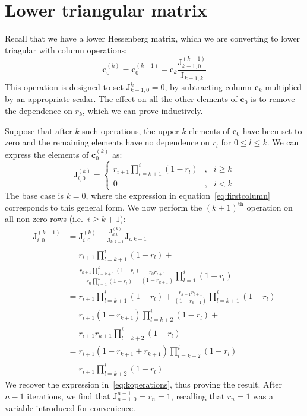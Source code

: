 \documentclass[aps,prl,twocolumn,floatfix]{revtex4}
\renewcommand{\vec}[1]{\mathbf{#1}}
\newcommand{\mat}[1]{\mathrm{#1}}
\begin{document}
\appendix
\section{Lower triangular matrix}
\label{app:triangular}
Recall that we have a lower Hessenberg matrix, which we are converting to lower
triagular with column operations:
\begin{equation}
  \vec{c}_{0}^{\left(k\right)} = \vec{c}_{0}^{\left(k-1\right)} - \vec{c}_{k}
  \frac{\mat{J}_{k-1,0}^{\left(k-1\right)}}{\mat{J}_{k-1,k}}
\end{equation}
This operation is designed to set \(\mat{J}_{k-1,0}^{k}=0\), by subtracting
column \(\vec{c}_{k}\) multiplied by an appropriate scalar. The effect on all
the other elements of \(\vec{c}_{0}\) is to remove the dependence on \(r_{k}\),
which we can prove inductively.

Suppose that after \(k\) such operations, the upper \(k\) elements of
\(\vec{c}_{0}\) have been set to zero and the remaining elements have no
dependence on \(r_{l}\) for \(0 \leq l \leq k\). We can express the elements of
\(\vec{c}_{0}^{\left(k\right)}\) as:
\begin{equation}
  \label{eq:koperations}
  \mat{J}_{i,0}^{\left(k\right)} = \left\{ \begin{array}{lcl}
    r_{i+1} \prod_{l=k+1}^{i} \left( 1-r_{l} \right) & , & i \geq k \\
    0 & , & i < k
  \end{array} \right.
\end{equation}
The base case is \(k=0\), where the expression in equation~\ref{eq:firstcolumn}
corresponds to this general form. We now perform the \(\left(k+1\right)^{
\text{th}}\) operation on all non-zero rows (i.e.\ \(i \geq k+1\)):
\begin{align}
  \mat{J}_{i,0}^{\left(k+1\right)} &= \mat{J}_{i,0}^{\left(k\right)} - 
    \frac{\mat{J}_{k,0}^{\left(k\right)}}{\mat{J}_{k,k+1}} \mat{J}_{i,k+1} \\
  &= r_{i+1}\prod_{l=k+1}^{i} \left( 1-r_{l} \right) + \\
  &\phantom{=} \frac{\displaystyle r_{k+1} \prod_{
    l=k+1}^{k} \left( 1-r_{l} \right) }{\displaystyle r_{0} \prod_{l=1}^{k}
    \left( 1-r_{l} \right) } \frac{ r_{0} r_{i+1} }{ \left( 1-r_{k+1} \right) }
    \prod_{ l=1 }^{i} \left( 1-r_{l} \right) \\
  &= r_{i+1} \prod_{l=k+1}^{i} \left( 1-r_{l} \right) + \frac{ r_{k+1} r_{i+1}
    }{ \left( 1-r_{k+1} \right) } \prod_{l=k+1}^{i} \left( 1-r_{l} \right) \\
  &= r_{i+1} \left( 1-r_{k+1} \right) \prod_{l=k+2}^{i} \left( 1-r_{l} \right)
    + \\
  &\phantom{=} r_{i+1} r_{k+1} \prod_{l=k+2}^{i} \left( 1-r_{l} \right) \\
  &= r_{i+1} \left( 1-r_{k+1}+r_{k+1} \right) \prod_{l=k+2}^{i} \left( 1-r_{l}
    \right) \\
  &= r_{i+1} \prod_{l=k+2}^{i} \left( 1-r_{l} \right)
\end{align}
We recover the expression in~\ref{eq:koperations}, thus proving the result.
After \(n-1\) iterations, we find that \(\mat{J}_{n-1,0}^{n-1}=r_{n}=1\),
recalling that \(r_{n}=1\) was a variable introduced for convenience.
\end{document}
